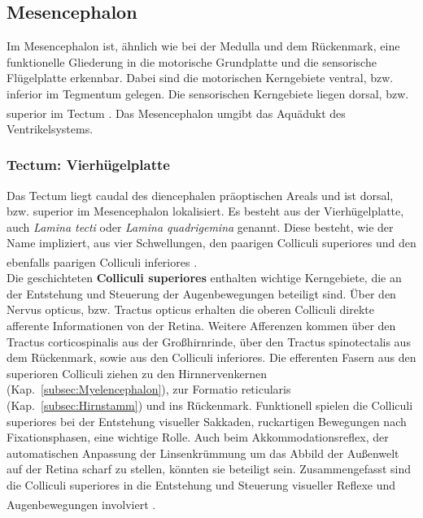 
\subsection{Mesencephalon}
\label{subsec:Mesencephalon} 

Im Mesencephalon ist, ähnlich wie bei der Medulla und dem Rückenmark, eine funktionelle Gliederung in die motorische Grundplatte und die sensorische Flügelplatte erkennbar. Dabei sind die motorischen Kerngebiete ventral, bzw. inferior im Tegmentum gelegen. Die sensorischen Kerngebiete liegen dorsal, bzw. superior im Tectum \textsuperscript{\cite[Kap.~6]{trepel2011neuroanatomie}}. Das Mesencephalon umgibt das Aquädukt des Ventrikelsystems.

\subsubsection{Tectum: Vierhügelplatte}
 
\label{subsubsec:Tectum}
Das Tectum liegt caudal des diencephalen präoptischen Areals und ist dorsal, bzw. superior im Mesencephalon lokalisiert. Es besteht aus der Vierhügelplatte, auch \textit{Lamina tecti} oder \textit{Lamina quadrigemina} genannt. Diese besteht, wie der Name impliziert, aus vier Schwellungen, den paarigen Colliculi superiores und den ebenfalls paarigen Colliculi inferiores \textsuperscript{\cite[Kap.~6]{trepel2011neuroanatomie}}.\\

\noindent Die geschichteten \textbf{Colliculi superiores} enthalten wichtige Kerngebiete, die an der Entstehung und Steuerung der Augenbewegungen beteiligt sind. Über den Nervus opticus, bzw. Tractus opticus erhalten die oberen Colliculi direkte afferente Informationen von der Retina. Weitere Afferenzen kommen über den Tractus corticospinalis aus der Großhirnrinde, über den Tractus spinotectalis aus dem Rückenmark, sowie aus den Colliculi inferiores. Die efferenten Fasern aus den superioren Colliculi ziehen zu den Hirnnervenkernen (Kap.~\ref{subsec:Myelencephalon}), zur Formatio reticularis (Kap.~\ref{subsec:Hirnstamm}) und ins Rückenmark. Funktionell spielen die Colliculi superiores bei der Entstehung visueller Sakkaden, ruckartigen Bewegungen nach Fixationsphasen, eine wichtige Rolle. Auch beim  Akkommodationsreflex, der automatischen Anpassung der Linsenkrümmung um das Abbild der Außenwelt auf der Retina scharf zu stellen, könnten sie beteiligt sein. Zusammengefasst sind die Colliculi superiores in die Entstehung und Steuerung visueller Reflexe und Augenbewegungen involviert \textsuperscript{\cite[Kap.~6]{trepel2011neuroanatomie}}.\\

